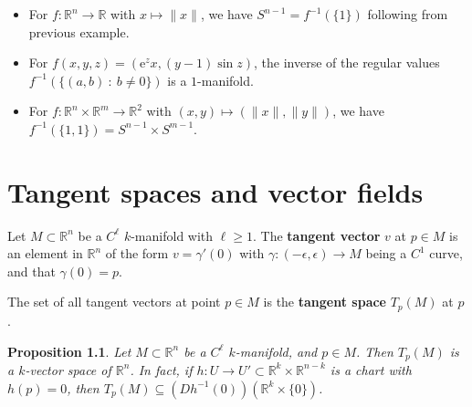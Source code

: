 \documentclass[letter-paper]{tufte-book}
\newtheorem{proposition}[theorem]{\color{pastel-blue}Proposition}
\newenvironment{example}[1][Example]{\begin{trivlist}
\item[\hskip \labelsep {\bfseries #1}]}{\end{trivlist}}
\newcommand{\ex}{\mathrm{e}}
\begin{document}
\begin{example}
  \begin{itemize}
    \item For $f:\mathbb{R}^n \to \mathbb{R}$ with $x \mapsto \|x\|$, we have
    $S^{n-1} = f^{-1}(\{1\})$ following from previous example.
    
    \item For $f(x,y,z) = (\ex^z x, (y-1) \sin z)$, the inverse of the regular
    values $f^{-1}(\{(a,b)\ :\ b\neq 0\})$ is a $1$-manifold.
    
    \item For $f:\mathbb{R}^n \times \mathbb{R}^m \to \mathbb{R}^2$ with $(x, y)
    \mapsto (\|x\|, \|y\|)$, we have $f^{-1}(\{1, 1\}) = S^{n-1} \times
    S^{m-1}$.
  \end{itemize}
\end{example}


\chapter{Tangent spaces and vector fields}

Let $M \subset \mathbb{R}^n$ be a $C^\ell$ $k$-manifold with $\ell \geq 1$. The
\textbf{tangent vector} $v$ at $p \in M$ is an element in $\mathbb{R}^n$ of the
form $v = \gamma'(0)$ with $\gamma : (-\epsilon, \epsilon) \to M$ being a $C^1$
curve, and that $\gamma(0) = p$.

The set of all tangent vectors at point $p \in M$ is the \textbf{tangent space}
$T_p(M)$ at $p$.

\begin{proposition}
  Let $M \subset \mathbb{R}^n$ be a $C^\ell$ $k$-manifold, and $p \in M$. Then
  $T_p(M)$ is a $k$-vector space of $\mathbb{R}^n$. In fact, if $h : U \to U'
  \subset \mathbb{R}^k \times \mathbb{R}^{n-k}$ is a chart with $h(p) = 0$, then
  $T_p(M) \subseteq (Dh^{-1}(0))(\mathbb{R}^k \times \{0\})$.
\end{proposition}
\end{document}
